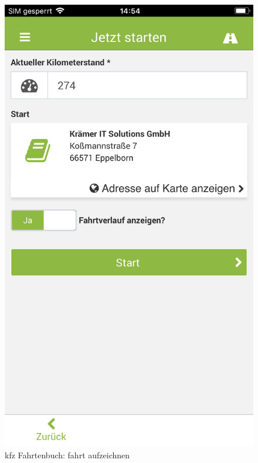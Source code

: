 \begin{figure}[H]
\begin{minipage}[b]{.4\linewidth}
        \includegraphics[scale=0.17]{img/kfz2}
        \caption{\label{img:img/kfz2}kfz Fahrtenbuch: fahrt aufzeichnen}
    \end{minipage}
\end{figure}

